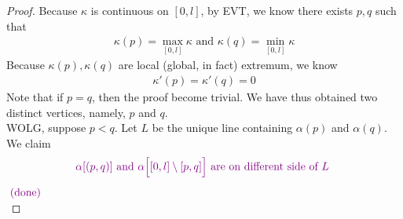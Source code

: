 \documentclass{report}
\begin{document}
\begin{proof}
Because $\kappa$ is continuous on $[0,l]$, by EVT, we know there exists $p,q$ such that 
 \begin{align*}
\kappa(p)= \max_{[0,l]}\kappa\text{ and }\kappa(q)= \min _{[0,l]}\kappa 
\end{align*}
Because $\kappa(p),\kappa(q)$ are local (global, in fact) extremum, we know 
\begin{align*}
\kappa'(p)=\kappa '(q)=0
\end{align*}
Note that if $p=q$, then the proof become trivial. We have thus obtained two distinct vertices, namely, $p$ and  $q$.\\

WOLG, suppose $p<q$. Let $L$ be the unique line containing $\alpha (p)$ and $\alpha (q)$. We claim 
\begin{align*}
\textcolor{violet}{\alpha [(p,q)]\text{ and }\alpha \Big[[0,l]\setminus [p,q] \Big]\text{ are on different side of $L$ }}
\end{align*}
$\textcolor{violet}{\text{ (done) }}$\\


\end{proof}
\end{document}

